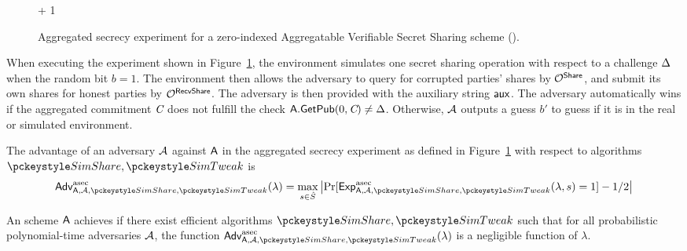 \begin{figure}[p]
\begin{pchstack}[boxed,center,space=1em]
\begin{pcvstack}
{    \simtotal \gets \simtotal + 1 \\
  }
  \pcvspace
  \end{pcvstack}
  \end{pchstack}

  \caption{Aggregated secrecy experiment for a zero-indexed Aggregatable Verifiable Secret Sharing scheme (\AVSS).
}
  \label{fg:avss-secrecy}
\end{figure}



When executing the experiment shown in Figure~\ref{fg:avss-secrecy},
the environment simulates one secret sharing operation with respect to a challenge $\Delta$ when the random bit $b=1$.
The environment then allows the adversary to query for corrupted parties' shares by $\mathcal{O}^{\mathsf{Share}}$,
and submit its own shares for honest parties by $\mathcal{O}^{\mathsf{RecvShare}}$.
The adversary is then provided with the auxiliary string $\mathsf{aux}$.
The adversary automatically wins if the aggregated commitment $\textit{C}$ does not
fulfill the check
$\mathsf{A}.\mathsf{GetPub}(0, \textit{C}) \neq \Delta$.
Otherwise,
$\mathcal{A}$ outputs a guess $b'$ to guess if it is in the real or simulated environment.

The advantage of an adversary $\mathcal{A}$ against $\mathsf{A}$ in the aggregated secrecy experiment as defined in Figure~\ref{fg:avss-secrecy} with respect to algorithms $\simshare,\simgettweak$ is
\[
  \advantaggsecrecy{\avss, \adv, \simshare,\simgettweak}(\lambda) = \max_{\secret \in \secretspace}{ \bigabs{\Pr[\AggSecrecyExp_{\avss, \adv,\simshare,\simgettweak}(\lambda,s) = 1 ] - 1/2 } }
 \]

\begin{definition}
\label{defn:aggsecrecy}
An \AVSS scheme $\mathsf{A}$ achieves  if
there exist efficient algorithms $\simshare, \simgettweak$ such that
for all probabilistic polynomial-time adversaries $\mathcal{A}$,
the function $\advantaggsecrecy{\avss, \adv,\simshare,\simgettweak}(\lambda)$
is a negligible function of $\lambda$.
\end{definition}

